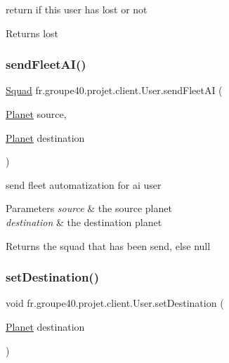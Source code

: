 return if this user has lost or not 

\begin{DoxyReturn}{Returns}
lost 
\end{DoxyReturn}
\mbox{\label{classfr_1_1groupe40_1_1projet_1_1client_1_1_user_a32007a7692972de524c9a03c813b97d1}} 
\subsubsection{\texorpdfstring{send\+Fleet\+A\+I()}{sendFleetAI()}}
{\footnotesize\ttfamily \hyperlink{classfr_1_1groupe40_1_1projet_1_1model_1_1ships_1_1_squad}{Squad} fr.\+groupe40.\+projet.\+client.\+User.\+send\+Fleet\+AI (\begin{DoxyParamCaption}\item[{\hyperlink{classfr_1_1groupe40_1_1projet_1_1model_1_1planets_1_1_planet}{Planet}}]{source,  }\item[{\hyperlink{classfr_1_1groupe40_1_1projet_1_1model_1_1planets_1_1_planet}{Planet}}]{destination }\end{DoxyParamCaption})}



send fleet automatization for ai user 


\begin{DoxyParams}{Parameters}
{\em source} & the source planet \\
\hline
{\em destination} & the destination planet \\
\hline
\end{DoxyParams}
\begin{DoxyReturn}{Returns}
the squad that has been send, else null 
\end{DoxyReturn}
\mbox{\label{classfr_1_1groupe40_1_1projet_1_1client_1_1_user_a4b36462569cbce5ac7c47ea1394f9a4c}} 
\subsubsection{\texorpdfstring{set\+Destination()}{setDestination()}}
{\footnotesize\ttfamily void fr.\+groupe40.\+projet.\+client.\+User.\+set\+Destination (\begin{DoxyParamCaption}\item[{\hyperlink{classfr_1_1groupe40_1_1projet_1_1model_1_1planets_1_1_planet}{Planet}}]{destination }\end{DoxyParamCaption})}


